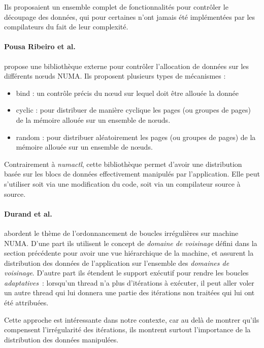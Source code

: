 Ils proposaient un ensemble complet de fonctionnalités pour contrôler le découpage des données, qui pour certaines n'ont jamais été implémentées par les compilateurs du fait de leur complexité.

\paragraph{Pousa Ribeiro et al.~\cite{Pousa2009}} propose une bibliothèque externe pour contrôler l'allocation de données sur les différents nœuds NUMA.
Ils proposent plusieurs types de mécanismes :
\begin{itemize}
  \item bind : un contrôle précis du nœud sur lequel doit être allouée la donnée
  \item cyclic : pour distribuer de manière cyclique les pages (ou groupes de pages) de la mémoire allouée sur un ensemble de nœuds.
  \item random : pour distribuer aléatoirement les pages (ou groupes de pages) de la mémoire allouée sur un ensemble de nœuds.
\end{itemize}

Contrairement à \emph{numactl}, cette bibliothèque permet d'avoir une distribution basée sur les blocs de données effectivement manipulés par l'application.
Elle peut s'utiliser soit via une modification du code, soit via un compilateur source à source.



\paragraph{Durand et al.~\cite{Durand2013}} abordent le thème de l'ordonnancement de boucles irrégulières sur machine NUMA.
D'une part ils utilisent le concept de \emph{domaine de voisinage} défini dans la section précédente pour avoir une vue hiérarchique de la machine, et assurent la distribution des données de l'application sur l'ensemble des \emph{domaines de voisinage}.
D'autre part ils étendent le support exécutif pour rendre les boucles \emph{adaptatives}~: lorsqu'un thread n'a plus d'itérations à exécuter, il peut aller voler un autre thread qui lui donnera une partie des itérations non traitées qui lui ont été attribuées.

Cette approche est intéressante dans notre contexte, car au delà de montrer qu'ils compensent l'irrégularité des itérations, ils montrent surtout l'importance de la distribution des données manipulées.

